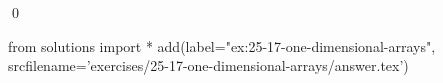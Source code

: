 
\begin{ex}
  \label{ex:25-17-one-dimensional-arrays}
  
  \qed
\end{ex}
\begin{python0}
from solutions import *
add(label="ex:25-17-one-dimensional-arrays",
    srcfilename='exercises/25-17-one-dimensional-arrays/answer.tex')
\end{python0}
